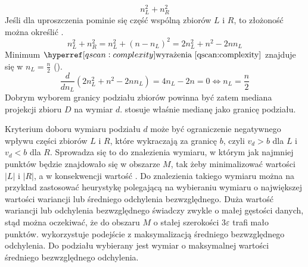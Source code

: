 \begin{equation} \label{qscan:complexity}
	n_L^2 + n_R^2
\end{equation}
Jeśli dla uproszczenia pominie się część wspólną zbiorów $ L $ i $ R $, to złożoność można określić .
\begin{equation} \label{qscan:complexity-fixed}
	n_L^2 + n_R^2 = n_L^2 + (n-n_L)^2 = 2n_L^2 + n^2 - 2nn_L
\end{equation}
Minimum $ \myhyperref{qscan:complexity}{wyrażenia} $ znajduje się w $ n_L = \frac{n}{2} $ ().
\begin{equation} \label{qscan:complexity:label}
	\frac{d}{dn_L}(2n_L^2 + n^2 - 2nn_L) = 4n_L - 2n = 0 \iff n_L = \frac{n}{2}
\end{equation}
Dobrym wyborem granicy podziału zbiorów powinna być zatem mediana projekcji zbioru $ D $ na wymiar $ d $.  stosuje właśnie medianę jako granicę podziału.\par
Kryterium doboru wymiaru podziału $ d $ może być ograniczenie negatywnego wpływu części zbiorów $ L $ i $ R $, które wykraczają za granicę $ b $, czyli $ v_d > b $ dla $ L $ i $ v_d < b $ dla $ R $. Sprowadza się to do znalezienia wymiaru, w którym jak najmniej punktów będzie znajdowało się w obszarze $ M $, tak żeby minimalizować wartości $ |L| $ i $ |R| $, a w konsekwencji wartość . Do znalezienia takiego wymiaru można na przykład zastosować heurystykę polegającą na wybieraniu wymiaru o największej wartości wariancji lub średniego odchylenia bezwzględnego. Duża wartość wariancji lub odchylenia bezwzględnego świadczy zwykle o małej gęstości danych, stąd można oczekiwać, że do obszaru $ M $ o stałej szerokości $ 3\varepsilon $ trafi mało punktów.  wykorzystuje podejście z maksymalizacją średniego bezwzględnego odchylenia. Do podziału wybierany jest wymiar o maksymalnej wartości średniego bezwzględnego odchylenia.\par

